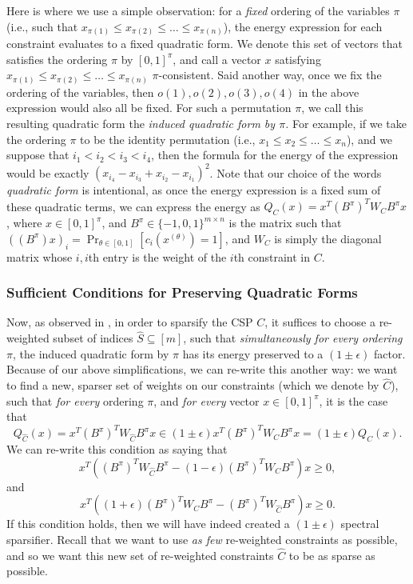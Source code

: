 \documentclass[11pt]{article}
\theoremstyle{definition}
\newcommand{\eps}{\epsilon}
\begin{document}
Here is where we use a simple observation: for a \emph{fixed} ordering of the variables $\pi$ (i.e., such that $x_{\pi(1)} \leq x_{\pi(2)} \leq \dots \leq x_{\pi(n)}$), the energy expression for each constraint evaluates to a fixed quadratic form. We denote this set of vectors that satisfies the ordering $\pi$ by $[0,1]^{\pi}$, and call a vector $x$ satisfying $x_{\pi(1)} \leq x_{\pi(2)} \leq \dots \leq x_{\pi(n)}$ $\pi$-consistent.
Said another way, once we fix the ordering of the variables, then $o(1), o(2), o(3), o(4)$ in the above expression would also all be fixed. For such a permutation $\pi$, we call this resulting quadratic form the \emph{induced quadratic form by $\pi$.} For example, if we take the ordering $\pi$ to be the identity permutation (i.e., $x_1 \leq x_2 \leq \dots \leq x_n$), and we suppose that $i_1 < i_2 < i_3 < i_4$, then the formula for the energy of the expression would be exactly $(x_{i_4} - x_{i_3}  + x_{i_2} - x_{i_1})^2$. Note that our choice of the words \emph{quadratic form} is intentional, as once the energy expression is a fixed sum of these quadratic terms, we can express the energy as $Q_{C}(x) = x^T (B^{\pi})^T W_C B^{\pi} x$, where $x \in [0,1]^{\pi}$, and $B^{\pi} \in \{-1,0,1\}^{m \times n}$ is the matrix such that $((B^{\pi}) x)_i = \Pr_{\theta \in [0,1]}[c_i(x^{(\theta)}) = 1]$, and $W_C$ is simply the diagonal matrix whose $i,i$th entry is the weight of the $i$th constraint in $C$. 


\subsubsection{Sufficient Conditions for Preserving Quadratic Forms}
Now, as observed in \cite{SY19}, in order to sparsify the CSP $C$, it suffices to choose a re-weighted subset of indices $\hat{S} \subseteq [m]$, such that \emph{simultaneously for every ordering} $\pi$, the induced quadratic form by $\pi$ has its energy preserved to a $(1 \pm \eps)$ factor. Because of our above simplifications, we can re-write this another way: we want to find a new, sparser set of weights on our constraints (which we denote by $\widehat{C}$), such that \emph{for every} ordering $\pi$, and \emph{for every} vector $x \in [0,1]^{\pi}$, it is the case that 
	\[
	Q_{\hat{C}}(x) = x^T (B^{\pi})^T W_{\hat{C}} B^{\pi} x \in (1 \pm \eps) x^T (B^{\pi})^T W_{C} B^{\pi}  x = (1 \pm \eps ) Q_{C}(x).
	\]	
	We can re-write this condition as saying that 
	\[
	 x^T \left ( (B^{\pi})^T W_{\hat{C}} B^{\pi} - (1 - \eps)(B^{\pi})^T W_{C} B^{\pi}  \right ) x \geq 0,
	\]
	and 
	\[
		 x^T \left ( (1 + \eps)(B^{\pi})^T W_{C} B^{\pi}  - (B^{\pi})^T W_{\hat{C}} B^{\pi}  \right ) x \geq 0.
	\]
If this condition holds, then we will have indeed created a $(1 \pm \eps)$ spectral sparsifier. Recall that we want to use \emph{as few} re-weighted constraints as possible, and so we want this new set of re-weighted constraints $\hat{C}$ to be as sparse as possible. 
\end{document}
